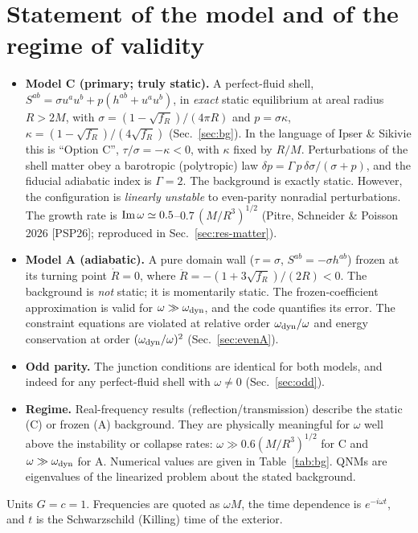 \documentclass[11pt,a4paper]{article}
\numberwithin{equation}{section}
\newcommand{\sq}{\sqrt{f_R}}
\begin{document}
\section*{Statement of the model and of the regime of validity}
\begin{itemize}
\item \textbf{Model C (primary; truly static).} A perfect-fluid shell,
  $S^{ab}=\sigma u^au^b+p(h^{ab}+u^au^b)$, in \emph{exact} static equilibrium at areal radius $R>2M$, with
  $\sigma=(1-\sq)/(4\pi R)$ and $p=\sigma\kappa$, $\kappa=(1-\sq)/(4\sq)$ (Sec.~\ref{sec:bg}). In the
  language of Ipser \& Sikivie this is ``Option C'', $\tau/\sigma=-\kappa<0$, with $\kappa$ fixed by $R/M$.
  Perturbations of the shell matter obey a barotropic (polytropic) law
  $\delta p=\Gamma\, p\,\delta\sigma/(\sigma+p)$, and the fiducial adiabatic index is $\Gamma=2$. The
  background is exactly static. However, the configuration is \emph{linearly unstable} to even-parity
  nonradial perturbations. The growth rate is ${\rm Im}\,\omega\simeq0.5$--$0.7\,(M/R^3)^{1/2}$
  (Pitre, Schneider \& Poisson 2026 [PSP26]; reproduced in Sec.~\ref{sec:res-matter}).
\item \textbf{Model A (adiabatic).} A pure domain wall ($\tau=\sigma$, $S^{ab}=-\sigma h^{ab}$) frozen at
  its turning point $\dot R=0$, where $\ddot R=-(1+3\sq)/(2R)<0$. The background is \emph{not} static; it is
  momentarily static. The frozen-coefficient approximation is valid for $\omega\gg\omega_{\rm dyn}$, and
  the code quantifies its error. The constraint equations are violated at relative order
  $\omega_{\rm dyn}/\omega$ and energy conservation at order $(\omega_{\rm dyn}/\omega)^2$
  (Sec.~\ref{sec:evenA}).
\item \textbf{Odd parity.} The junction conditions are identical for both models, and indeed for any
  perfect-fluid shell with $\omega\neq0$ (Sec.~\ref{sec:odd}).
\item \textbf{Regime.} Real-frequency results (reflection/transmission) describe the static (C) or frozen
  (A) background. They are physically meaningful for $\omega$ well above the instability or collapse
  rates: $\omega\gg0.6(M/R^3)^{1/2}$ for C and $\omega\gg\omega_{\rm dyn}$ for A. Numerical values
  are given in Table~\ref{tab:bg}. QNMs are eigenvalues of the linearized problem about the stated
  background.
\end{itemize}
Units $G=c=1$. Frequencies are quoted as $\omega M$, the time dependence is $e^{-i\omega t}$, and $t$ is the
Schwarzschild (Killing) time of the exterior.
\end{document}
